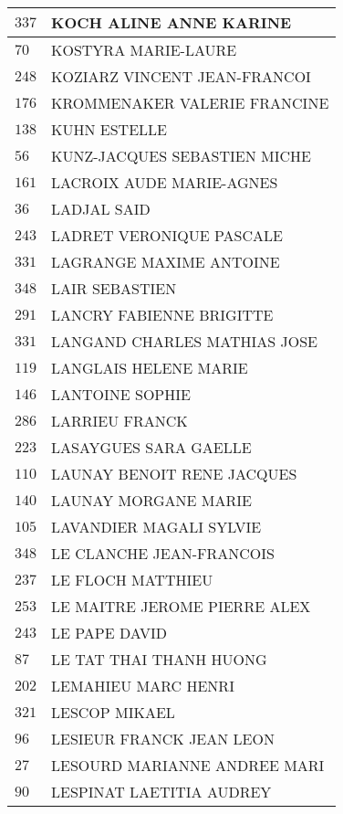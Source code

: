\begin{xltabular}{\linewidth}{|l|X|}
    \hline
    $337$ & KOCH ALINE ANNE KARINE \\
    \hline
    $70$ & KOSTYRA MARIE-LAURE \\
    \hline
    $248$ & KOZIARZ VINCENT JEAN-FRANCOI \\
    \hline
    $176$ & KROMMENAKER VALERIE FRANCINE \\
    \hline
    $138$ & KUHN ESTELLE \\
    \hline
    $56$ & KUNZ-JACQUES SEBASTIEN MICHE \\
    \hline
    $161$ & LACROIX AUDE MARIE-AGNES \\
    \hline
    $36$ & LADJAL SAID \\
    \hline
    $243$ & LADRET VERONIQUE PASCALE \\
    \hline
    $331$ & LAGRANGE MAXIME ANTOINE \\
    \hline
    $348$ & LAIR SEBASTIEN \\
    \hline
    $291$ & LANCRY FABIENNE BRIGITTE \\
    \hline
    $331$ & LANGAND CHARLES MATHIAS JOSE \\
    \hline
    $119$ & LANGLAIS HELENE MARIE \\
    \hline
    $146$ & LANTOINE SOPHIE \\
    \hline
    $286$ & LARRIEU FRANCK \\
    \hline
    $223$ & LASAYGUES SARA GAELLE \\
    \hline
    $110$ & LAUNAY BENOIT RENE JACQUES \\
    \hline
    $140$ & LAUNAY MORGANE MARIE \\
    \hline
    $105$ & LAVANDIER MAGALI SYLVIE \\
    \hline
    $348$ & LE CLANCHE JEAN-FRANCOIS \\
    \hline
    $237$ & LE FLOCH MATTHIEU \\
    \hline
    $253$ & LE MAITRE JEROME PIERRE ALEX \\
    \hline
    $243$ & LE PAPE DAVID \\
    \hline
    $87$ & LE TAT THAI THANH HUONG \\
    \hline
    $202$ & LEMAHIEU MARC HENRI \\
    \hline
    $321$ & LESCOP MIKAEL \\
    \hline
    $96$ & LESIEUR FRANCK JEAN LEON \\
    \hline
    $27$ & LESOURD MARIANNE ANDREE MARI \\
    \hline
    $90$ & LESPINAT LAETITIA AUDREY \\

\end{xltabular}
